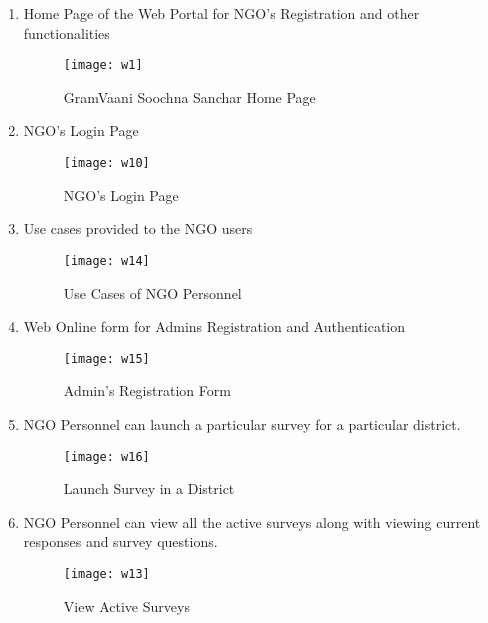 \begin{enumerate}
\item Home Page of the Web Portal for NGO's Registration and other functionalities
\begin{figure}[here]
\begin{center}   
\texttt{[image: w1]}
\caption{GramVaani Soochna Sanchar Home Page}
\label{fig:w1}
\end{center}
\end{figure}


\item NGO's Login Page
\begin{figure}[here]
\begin{center}   
\texttt{[image: w10]}
\caption{NGO's Login Page}
\label{fig:w10}
\end{center}
\end{figure}



\item Use cases provided to the NGO users
\begin{figure}[here]
\begin{center}   
\texttt{[image: w14]}
\caption{Use Cases of NGO Personnel}
\label{fig:w14}
\end{center}
\end{figure}



\item Web Online form for Admins Registration and Authentication
\begin{figure}[here]
\begin{center}   
\texttt{[image: w15]}
\caption{Admin's Registration Form}
\label{fig:w15}
\end{center}
\end{figure}




\item NGO Personnel can launch a particular survey for a particular district.
\begin{figure}[here]
\begin{center}   
\texttt{[image: w16]}
\caption{Launch Survey in a District}
\label{fig:w16}
\end{center}
\end{figure}


\item NGO Personnel can view all the active surveys along with viewing current responses and survey questions.
\begin{figure}[here]
\begin{center}   
\texttt{[image: w13]}
\caption{View Active Surveys}
\label{fig:w13}
\end{center}
\end{figure}



\end{enumerate}
